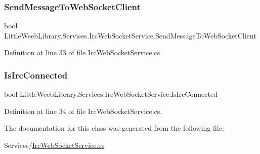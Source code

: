 \subsubsection{\texorpdfstring{Send\+Message\+To\+Web\+Socket\+Client}{SendMessageToWebSocketClient}}
{\footnotesize\ttfamily bool Little\+Weeb\+Library.\+Services.\+Irc\+Web\+Socket\+Service.\+Send\+Message\+To\+Web\+Socket\+Client\hspace{0.3cm}{\ttfamily [private]}}



Definition at line 33 of file Irc\+Web\+Socket\+Service.\+cs.

\mbox{\label{class_little_weeb_library_1_1_services_1_1_irc_web_socket_service_a6621f29728a33aa4be9edbdba319ac9e}} 
\subsubsection{\texorpdfstring{Is\+Irc\+Connected}{IsIrcConnected}}
{\footnotesize\ttfamily bool Little\+Weeb\+Library.\+Services.\+Irc\+Web\+Socket\+Service.\+Is\+Irc\+Connected\hspace{0.3cm}{\ttfamily [private]}}



Definition at line 34 of file Irc\+Web\+Socket\+Service.\+cs.



The documentation for this class was generated from the following file\+:\begin{DoxyCompactItemize}
\item 
Services/\mbox{\hyperlink{_irc_web_socket_service_8cs}{Irc\+Web\+Socket\+Service.\+cs}}\end{DoxyCompactItemize}
